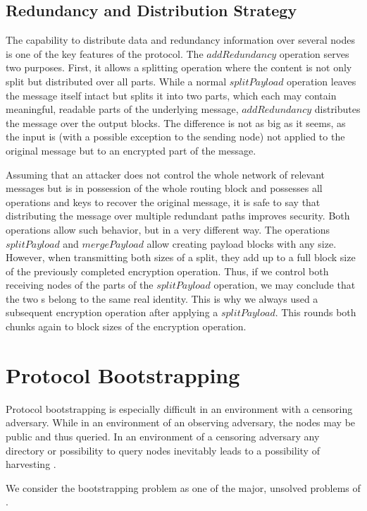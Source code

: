 \section{Redundancy and Distribution Strategy}
The capability to distribute data and redundancy information over several nodes is one of the key features of the protocol. The $addRedundancy$ operation serves two purposes. First, it allows a splitting operation where the content is not only split but distributed over all parts. While a normal $splitPayload$ operation leaves the message itself intact but splits it into two parts, which each may contain meaningful, readable parts of the underlying message, $addRedundancy$ distributes the message over the output blocks. The difference is not as big as it seems, as the input is (with a possible exception to the sending node) not applied to the original message but to an encrypted part of the message.

Assuming that an attacker does not control the whole network of relevant messages but is in possession of the whole routing block and possesses all operations and keys to recover the original message, it is safe to say that distributing the message over multiple redundant paths improves security. Both operations allow such behavior, but in a very different way. The operations $splitPayload$ and $mergePayload$ allow creating payload blocks with any size. However, when transmitting both sizes of a split, they add up to a full block size of the previously completed encryption operation. Thus, if we control both receiving nodes of the parts of the $splitPayload$ operation, we may conclude that the two s belong to the same real identity. This is why we always used a subsequent encryption operation after applying a $splitPayload$. This rounds both chunks again to block sizes of the encryption operation.

\chapter{Protocol Bootstrapping\label{sec:keyDistribution}}
Protocol bootstrapping is especially difficult in an environment with a censoring adversary. While in an environment of an observing adversary, the nodes may be public and thus queried. In an environment of a censoring adversary any directory or possibility to query nodes inevitably leads to a possibility of harvesting \VortexNodes{}. 

We consider the bootstrapping problem as one of the major, unsolved problems of \MessageVortex.


